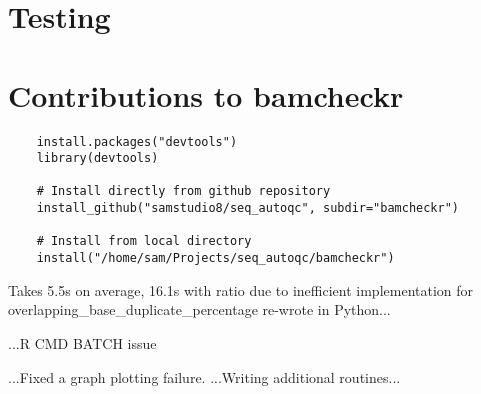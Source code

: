 \section{Testing}

\section{Contributions to bamcheckr}
\begin{verbatim}
    install.packages("devtools")
    library(devtools)

    # Install directly from github repository
    install_github("samstudio8/seq_autoqc", subdir="bamcheckr")

    # Install from local directory
    install("/home/sam/Projects/seq_autoqc/bamcheckr")

\end{verbatim}
Takes 5.5s on average, 16.1s with ratio due to inefficient implementation
for overlapping\_base\_duplicate\_percentage
re-wrote in Python...


...R CMD BATCH issue

...Fixed a graph plotting failure.
...Writing additional routines...



